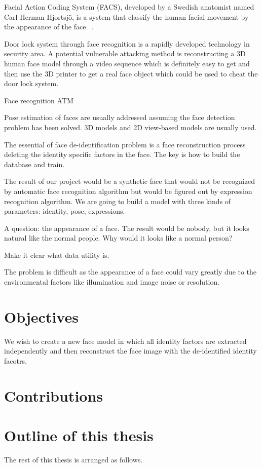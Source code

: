 Facial Action Coding System (FACS), developed by a Swedish anatomist named Carl-Herman Hjortsjö, is a system that classify the human facial movement by the appearance of the face ~\cite{facs70}. 


\par
Door lock system through face recognition is a rapidly developed technology in security area. A potential vulnerable attacking method is reconstructing a 3D human face model through a video sequence which is definitely easy to get and then use the 3D printer to get a real face object which could be used to cheat the door lock system. 

Face recognition ATM



Pose estimation of faces are usually addressed assuming the face detection problem has been solved. 3D models and 2D view-based models are usually used. 


The essential of face de-identification problem is a face reconstruction process deleting the identity specific factors in the face.  
The key is how to build the database and train. 

The result of our project would be a synthetic face that would not be recognized by automatic face recognition algorithm but would be figured out by expression recognition algorithm. We are going to build a model with three kinds of parameters: identity, pose, expressions. 

A question: the appearance of a face. The result would be nobody, but it looks natural like the normal people. Why would it looks like a normal person?

Make it clear what data utility is. 

The problem is difficult as the appearance of a face could vary greatly due to the environmental factors like illumination and image noise or resolution. 

\section{Objectives}
We wish to create a new face model in which all identity factors are extracted independently and then reconstruct the face image with the de-identified identity facotrs. 

\section{Contributions}
\par


\section{Outline of this thesis}
\par 
The rest of this thesis is arranged as follows. 